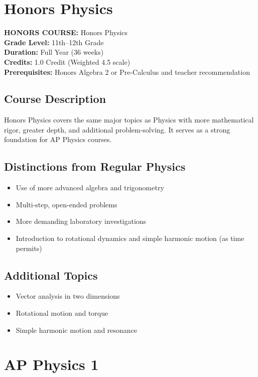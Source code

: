 \documentclass[12pt,oneside]{book}
\begin{document}
\chapter{Honors Physics}

\noindent\textbf{HONORS COURSE:} Honors Physics\\
\textbf{Grade Level:} 11th--12th Grade\\
\textbf{Duration:} Full Year (36 weeks)\\
\textbf{Credits:} 1.0 Credit (Weighted 4.5 scale)\\
\textbf{Prerequisites:} Honors Algebra 2 or Pre-Calculus and teacher recommendation

\section{Course Description}
Honors Physics covers the same major topics as Physics with more mathematical rigor,
greater depth, and additional problem-solving. It serves as a strong foundation for
AP Physics courses.

\section{Distinctions from Regular Physics}
\begin{itemize}[leftmargin=2em]
    \item Use of more advanced algebra and trigonometry
    \item Multi-step, open-ended problems
    \item More demanding laboratory investigations
    \item Introduction to rotational dynamics and simple harmonic motion (as time permits)
\end{itemize}

\section{Additional Topics}
\begin{itemize}[leftmargin=2em]
    \item Vector analysis in two dimensions
    \item Rotational motion and torque
    \item Simple harmonic motion and resonance
\end{itemize}

\chapter{AP Physics 1}
\end{document}
